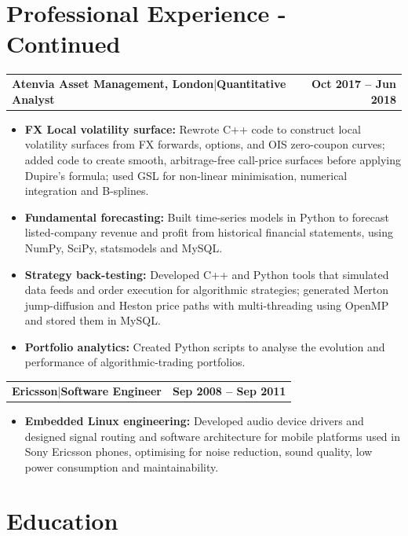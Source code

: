 \documentclass[10pt,a4paper]{article}
\makeatletter
\newcommand{\job}[4]{%
  \noindent\begin{tabularx}{\textwidth}{@{}X r@{}}
    \textbf{\color{Navy}#1, #2}\enspace|\enspace\textbf{#3} &
    \textbf{\color{Muted}#4}
  \end{tabularx}\vspace{-0.6ex}
}
\newcommand{\jobnoloc}[3]{%
  \noindent\begin{tabularx}{\textwidth}{@{}X r@{}}
    \textbf{\color{Navy}#1}\enspace|\enspace\textbf{#2} &
    \textbf{\color{Muted}#3}
  \end{tabularx}\vspace{-0.6ex}
}
\makeatother
\begin{document}
\newpage{}
\section{Professional Experience - Continued}

\job{Atenvia Asset Management}{London}{Quantitative Analyst}{Oct
2017 -- Jun 2018} 
\begin{itemize}
\item \textbf{FX Local volatility surface:} Rewrote C++
  code to construct local volatility surfaces from FX forwards,
  options, and OIS zero-coupon curves; added code to create smooth,
  arbitrage-free call-price surfaces before applying Dupire's
  formula; used GSL for non-linear minimisation, numerical integration
  and B-splines.

\item \textbf{Fundamental forecasting:} Built time-series models in Python
  to forecast listed-company revenue and profit from historical financial
  statements, using NumPy, SciPy, statsmodels and MySQL.
  
\item \textbf{Strategy back-testing:} Developed C++ and Python tools that
  simulated data feeds and order execution for algorithmic strategies;
  generated Merton jump-diffusion and Heston price paths with
  multi-threading using OpenMP and stored them in MySQL.
  
\item \textbf{Portfolio analytics:} Created Python scripts to analyse the
  evolution and performance of algorithmic-trading portfolios.

\end{itemize}

\jobnoloc{Ericsson}{Software Engineer}{Sep 2008 -- Sep 2011} 
\begin{itemize}
\item \textbf{Embedded Linux engineering:} Developed audio device drivers
  and designed signal routing and software architecture for mobile platforms
  used in Sony Ericsson phones, optimising for noise reduction, sound
  quality, low power consumption and maintainability.
\end{itemize}

\section{Education}
\end{document}
